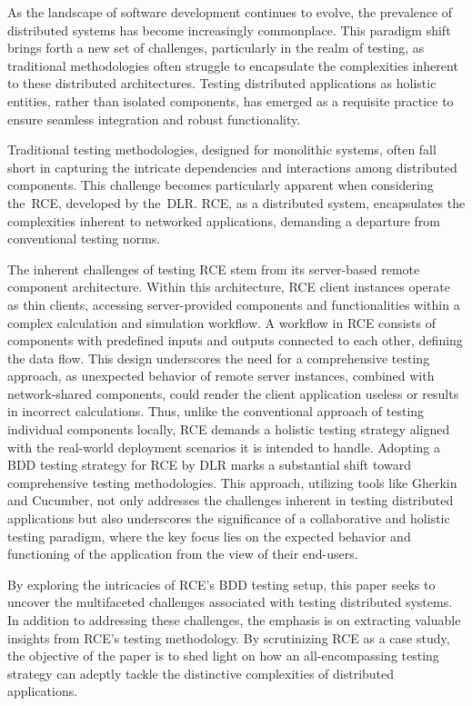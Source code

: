 As the landscape of software development continues to evolve, the prevalence of distributed systems has become increasingly commonplace. This paradigm shift brings forth a new set of challenges, particularly in the realm of testing, as traditional methodologies often struggle to encapsulate the complexities inherent to these distributed architectures. Testing distributed applications as holistic entities, rather than isolated components, has emerged as a requisite practice to ensure seamless integration and robust functionality.

Traditional testing methodologies, designed for monolithic systems, often fall short in capturing the intricate dependencies and interactions among distributed components. This challenge becomes particularly apparent when considering the~\ac{RCE}, developed by the~\ac{DLR}. \ac{RCE}, as a distributed system, encapsulates the complexities inherent to networked applications, demanding a departure from conventional testing norms.

The inherent challenges of testing \ac{RCE} stem from its server-based remote component architecture. Within this architecture, \ac{RCE} client instances operate as thin clients, accessing server-provided components and functionalities within a complex calculation and simulation workflow. A workflow in \ac{RCE} consists of components with predefined inputs and outputs connected to each other, defining the data flow. This design underscores the need for a comprehensive testing approach, as unexpected behavior of remote server instances, combined with network-shared components, could render the client application useless or results in incorrect calculations. Thus, unlike the conventional approach of testing individual components locally, \ac{RCE} demands a holistic testing strategy aligned with the real-world deployment scenarios it is intended to handle. Adopting a \acf{BDD} testing strategy for \ac{RCE} by \ac{DLR} marks a substantial shift toward comprehensive testing methodologies. This approach, utilizing tools like Gherkin and Cucumber, not only addresses the challenges inherent in testing distributed applications but also underscores the significance of a collaborative and holistic testing paradigm, where the key focus lies on the expected behavior and functioning of the application from the view of their end-users.

By exploring the intricacies of \ac{RCE}'s BDD testing setup, this paper seeks to uncover the multifaceted challenges associated with testing distributed systems. In addition to addressing these challenges, the emphasis is on extracting valuable insights from \ac{RCE}'s testing methodology. By scrutinizing \ac{RCE} as a case study, the objective of the paper is to shed light on how an all-encompassing testing strategy can adeptly tackle the distinctive complexities of distributed applications. 
